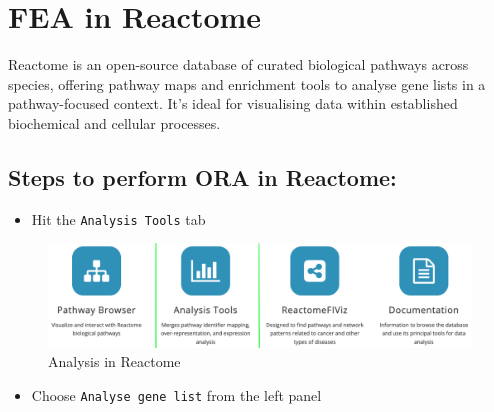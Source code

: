 \documentclass[
]{book}
\providecommand{\tightlist}{%
  \setlength{\itemsep}{0pt}\setlength{\parskip}{0pt}}
\begin{document}
\hypertarget{section-4}{%
\subsubsection*{}\label{section-4}}

\hypertarget{fea-in-reactome}{%
\section{\texorpdfstring{FEA in Reactome }{FEA in Reactome }}\label{fea-in-reactome}}

Reactome is an open-source database of curated biological pathways across species, offering pathway maps and enrichment tools to analyse gene lists in a pathway-focused context. It's ideal for visualising data within established biochemical and cellular processes.

\hypertarget{steps-to-perform-ora-in-reactome}{%
\subsection{Steps to perform ORA in Reactome:}\label{steps-to-perform-ora-in-reactome}}

\begin{itemize}
\tightlist
\item
  Hit the \texttt{Analysis\ Tools} tab
\end{itemize}

\begin{figure}

{\centering \includegraphics[width=1\linewidth]{images/reactome-tabs} 

}

\caption{Analysis in Reactome}\label{fig:unnamed-chunk-27}
\end{figure}

\begin{itemize}
\tightlist
\item
  Choose \texttt{Analyse\ gene\ list} from the left panel
\end{itemize}
\end{document}
